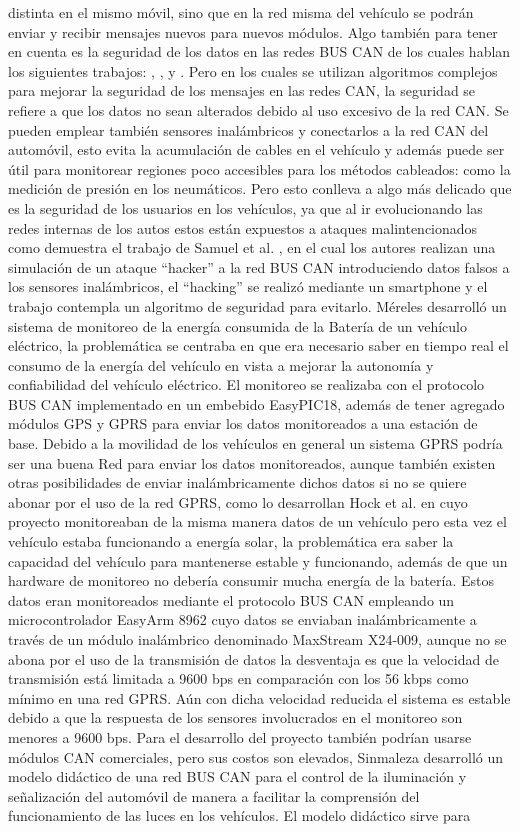 distinta en el mismo móvil, sino que en la red misma del vehículo se podrán enviar y recibir mensajes nuevos para nuevos módulos. Algo también para tener en cuenta es la seguridad de los datos en las redes BUS CAN de los cuales hablan los siguientes trabajos:
\cite{RS}, \cite{EP}, \cite{ADA} y \cite{RPA}. Pero en los cuales se utilizan algoritmos complejos para mejorar la seguridad de los mensajes en las redes CAN, la seguridad se refiere a que los datos no sean alterados debido al uso excesivo de la red CAN. Se pueden emplear también sensores inalámbricos y conectarlos a la red CAN del automóvil, esto evita la acumulación de cables en el vehículo y además puede ser útil para monitorear regiones poco accesibles para los métodos cableados: como la medición de presión en los neumáticos. Pero esto conlleva a algo más delicado que es la seguridad de los usuarios en los vehículos, ya que al ir evolucionando las redes internas de los autos estos están expuestos a ataques malintencionados como demuestra el trabajo de Samuel et al. \cite{ACAN},  en el cual los autores realizan una simulación de un ataque “hacker” a la red BUS CAN introduciendo datos falsos a los sensores inalámbricos, el “hacking” se realizó mediante un smartphone y el trabajo contempla un algoritmo de seguridad para evitarlo. Méreles \cite{PSMR} desarrolló un sistema de monitoreo de la energía consumida de la Batería de un vehículo eléctrico, la problemática se centraba en que era necesario saber en tiempo real el consumo de la energía del vehículo en vista a mejorar la autonomía y confiabilidad del vehículo eléctrico. El monitoreo se realizaba con el protocolo BUS CAN implementado en un embebido EasyPIC18, además de tener agregado módulos GPS y GPRS para enviar los datos monitoreados a una estación de base. Debido a la movilidad de los vehículos en general un sistema GPRS podría ser una buena Red para enviar los datos monitoreados, aunque también existen otras posibilidades de enviar inalámbricamente dichos datos si no se quiere abonar por el uso de la red GPRS, como lo desarrollan  Hock et al. \cite{DWCAN} en cuyo proyecto monitoreaban de la misma manera datos de un vehículo pero esta vez el vehículo estaba funcionando a energía solar, la problemática era saber la capacidad del vehículo para mantenerse estable y funcionando, además de que un hardware de monitoreo no debería consumir mucha energía de la batería. Estos datos eran monitoreados mediante el protocolo BUS CAN empleando un microcontrolador EasyArm 8962 cuyo datos se enviaban inalámbricamente a través de un  módulo inalámbrico denominado MaxStream X24-009, aunque no se abona por el uso de la transmisión de datos la desventaja es que la velocidad de transmisión está limitada a 9600 bps en comparación con los 56 kbps como mínimo en una red GPRS. Aún con dicha velocidad reducida el sistema es estable debido a que la respuesta de los sensores involucrados en el monitoreo son menores a 9600 bps. Para el desarrollo del proyecto también podrían usarse módulos  CAN comerciales, pero sus costos son elevados, Sinmaleza \cite{CMDI} desarrolló un modelo didáctico de una red BUS CAN para el control de la iluminación y señalización del automóvil de manera a facilitar la comprensión del funcionamiento de las luces en los vehículos. El modelo didáctico sirve para 